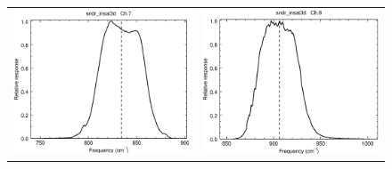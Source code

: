 \begin{figure}[H]
  \centering
  \begin{tabular}{c c}
    \includegraphics[scale=0.35]{graphics/sndr/srf/sndr_insat3d-7.eps} &
    \includegraphics[scale=0.35]{graphics/sndr/srf/sndr_insat3d-8.eps} \\

\end{tabular}
\end{figure}
